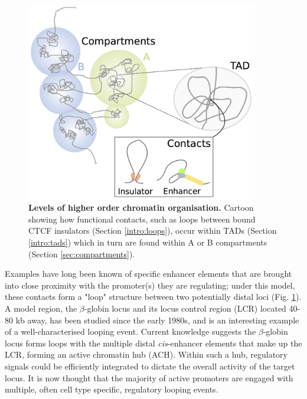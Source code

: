 \documentclass[a4paper,11pt,oneside]{book}
\begin{document}
\begin{figure}
\begin{center}
\includegraphics[width=4in]{genome_org.png}
\captionsetup{width=\textwidth}
\caption[Levels of higher order chromatin organisation.]{ {\bf Levels of higher order chromatin organisation. } 
  Cartoon showing how functional contacts, such as loops between bound CTCF insulators (Section \ref{intro:loops}), occur within TADs (Section \ref{intro:tads}) which in turn are found within A or B compartments (Section \ref{sec:compartments}).
}\label{fig:genomeorg}
\end{center}
\end{figure} 

Examples have long been known of specific enhancer elements that are brought into close proximity with the promoter(s) they are regulating; under this model, these contacts form a "loop" structure between two potentially distal loci\cite{Kadauke2009a, Sexton2009} (Fig. \ref{fig:genomeorg}). A model region, the $\beta$-globin locus and its locus control region (LCR) located 40-80 kb away,\cite{Dekker2013} has been studied since the early 1980s,\cite{Banerji1981, Engel2000, Blackwood1998, Tolhuis2002} and is an interesting example of a well-characterised looping event. Current knowledge suggests the $\beta$-globin locus forms loops with the multiple distal \emph{cis}-enhancer elements that make up the LCR, forming an active chromatin hub (ACH).\cite{VandeCorput2012a} Within such a hub, regulatory signals could be efficiently integrated to dictate the overall activity of the target locus.\cite{DeWit2012, Pombo2015} It is now thought that the majority of active promoters are engaged with multiple, often cell type specific, regulatory looping events.\cite{Sanyal2012, Jin2013}
\end{document}
